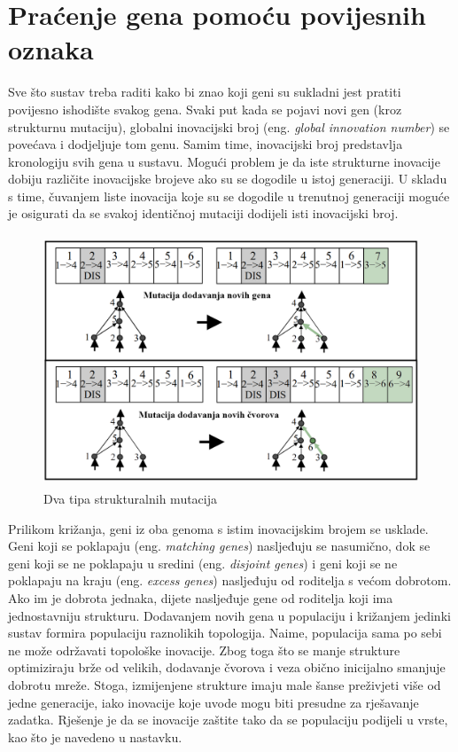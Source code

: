 \documentclass[times, utf8, diplomski, numeric]{fer}
\begin{document}
\section{Praćenje gena pomoću povijesnih oznaka}
Sve što sustav treba raditi kako bi znao koji geni su sukladni jest pratiti povijesno ishodište svakog gena. Svaki put kada se pojavi novi gen (kroz strukturnu mutaciju), globalni inovacijski broj (eng. \textit{global innovation number}) se povećava i dodjeljuje tom genu. Samim time, inovacijski broj predstavlja kronologiju svih gena u sustavu. Mogući problem je da iste strukturne inovacije dobiju različite inovacijske brojeve ako su se dogodile u istoj generaciji. U skladu s time, čuvanjem liste inovacija koje su se dogodile u trenutnoj generaciji moguće je osigurati da se svakoj identičnoj mutaciji dodijeli isti inovacijski broj.

\begin{figure}
  \centering
  \includegraphics[height=7.5cm]{slika5}
  \caption{Dva tipa strukturalnih mutacija \citep{rad2}}
  \label{slika5}
\end{figure}

Prilikom križanja, geni iz oba genoma s istim inovacijskim brojem se usklade. Geni koji se poklapaju (eng. \textit{matching genes}) nasljeđuju se nasumično, dok se geni koji se ne poklapaju u sredini (eng. \textit{disjoint genes}) i geni koji se ne poklapaju na kraju (eng. \textit{excess genes}) nasljeđuju od roditelja s većom dobrotom. Ako im je dobrota jednaka, dijete nasljeđuje gene od roditelja koji ima jednostavniju strukturu. Dodavanjem novih gena u populaciju i križanjem jedinki sustav formira populaciju raznolikih topologija. Naime, populacija sama po sebi ne može održavati topološke inovacije. Zbog toga što se manje strukture optimiziraju brže od velikih, dodavanje čvorova i veza obično inicijalno smanjuje dobrotu mreže. Stoga, izmijenjene strukture imaju male šanse preživjeti više od jedne generacije, iako inovacije koje uvode mogu biti presudne za rješavanje zadatka. Rješenje je da se inovacije zaštite tako da se populaciju podijeli u vrste, kao što je navedeno u nastavku.
\end{document}
